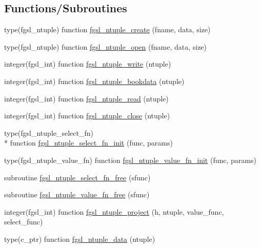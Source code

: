 \subsection*{Functions/\-Subroutines}
\begin{DoxyCompactItemize}
\item 
type(fgsl\-\_\-ntuple) function \hyperlink{ntuple_8finc_a53e8e8c2b59e9996577478079aec392a}{fgsl\-\_\-ntuple\-\_\-create} (fname, data, size)
\item 
type(fgsl\-\_\-ntuple) function \hyperlink{ntuple_8finc_a825ef23e9dc1d74ff1a263191c490bd0}{fgsl\-\_\-ntuple\-\_\-open} (fname, data, size)
\item 
integer(fgsl\-\_\-int) function \hyperlink{ntuple_8finc_a356af99564ad1459930057c34017e161}{fgsl\-\_\-ntuple\-\_\-write} (ntuple)
\item 
integer(fgsl\-\_\-int) function \hyperlink{ntuple_8finc_a88cfeaf087d36f1e4e6a0d81ac04bdb3}{fgsl\-\_\-ntuple\-\_\-bookdata} (ntuple)
\item 
integer(fgsl\-\_\-int) function \hyperlink{ntuple_8finc_a479c00a78c57f2b3b14cc9f12a514b6b}{fgsl\-\_\-ntuple\-\_\-read} (ntuple)
\item 
integer(fgsl\-\_\-int) function \hyperlink{ntuple_8finc_a1a996c87696028b62352cd43a82a6879}{fgsl\-\_\-ntuple\-\_\-close} (ntuple)
\item 
type(fgsl\-\_\-ntuple\-\_\-select\-\_\-fn) \\*
function \hyperlink{ntuple_8finc_aa04c4dfcb377f33a3a63fc7415cb3e3f}{fgsl\-\_\-ntuple\-\_\-select\-\_\-fn\-\_\-init} (func, params)
\item 
type(fgsl\-\_\-ntuple\-\_\-value\-\_\-fn) function \hyperlink{ntuple_8finc_a5672a466c45b2c1eaf5cf76209e6d282}{fgsl\-\_\-ntuple\-\_\-value\-\_\-fn\-\_\-init} (func, params)
\item 
subroutine \hyperlink{ntuple_8finc_ad8dde1fb48951e3df2ed85fdd4dbe928}{fgsl\-\_\-ntuple\-\_\-select\-\_\-fn\-\_\-free} (sfunc)
\item 
subroutine \hyperlink{ntuple_8finc_a79a22db8b1a4e150923981198b5c7aab}{fgsl\-\_\-ntuple\-\_\-value\-\_\-fn\-\_\-free} (sfunc)
\item 
integer(fgsl\-\_\-int) function \hyperlink{ntuple_8finc_ac2d58b11f74188b4b684a7e1bb701042}{fgsl\-\_\-ntuple\-\_\-project} (h, ntuple, value\-\_\-func, select\-\_\-func)
\item 
type(c\-\_\-ptr) function \hyperlink{ntuple_8finc_a6fd6e5da6139dffa2f6f61aa8aceafb1}{fgsl\-\_\-ntuple\-\_\-data} (ntuple)
\item 

\end{DoxyCompactItemize}
